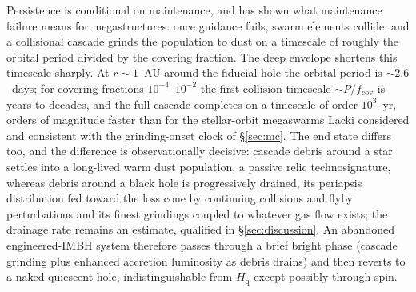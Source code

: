 \documentclass[11pt]{article}
\newcommand{\Hgas}{\ensuremath{H_{\mathrm{q}}}}
\begin{document}
Persistence is conditional on maintenance, and \citet{Lacki2025Cascade} has shown what maintenance failure means for megastructures: once guidance fails, swarm elements collide, and a collisional cascade grinds the population to dust on a timescale of roughly the orbital period divided by the covering fraction. The deep envelope shortens this timescale sharply. At $r \sim 1$~AU around the fiducial hole the orbital period is $\sim 2.6$~days; for covering fractions $10^{-4}$--$10^{-2}$ the first-collision timescale $\sim P/f_{\mathrm{cov}}$ is years to decades, and the full cascade completes on a timescale of order $10^{3}$~yr, orders of magnitude faster than for the stellar-orbit megaswarms Lacki considered and consistent with the grinding-onset clock of \S\ref{sec:mc}. The end state differs too, and the difference is observationally decisive: cascade debris around a star settles into a long-lived warm dust population, a passive relic technosignature, whereas debris around a black hole is progressively drained, its periapsis distribution fed toward the loss cone by continuing collisions and flyby perturbations and its finest grindings coupled to whatever gas flow exists; the drainage rate remains an estimate, qualified in \S\ref{sec:discussion}. An abandoned engineered-IMBH system therefore passes through a brief bright phase (cascade grinding plus enhanced accretion luminosity as debris drains) and then reverts to a naked quiescent hole, indistinguishable from \Hgas{} except possibly through spin.
\end{document}
